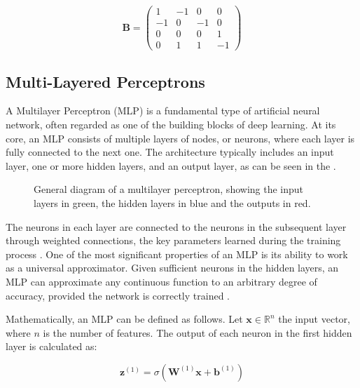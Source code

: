 \[
\mathbf{B} = \begin{pmatrix}
1 & -1 & 0 & 0 \\
-1 & 0 & -1 & 0 \\
0 & 0 & 0 & 1  \\
0 & 1 & 1 & -1 
\end{pmatrix}
\]

\subsection{Multi-Layered Perceptrons}

A Multilayer Perceptron (MLP) is a fundamental type of artificial neural network, often regarded as one of the building blocks of deep learning. At its core, an MLP consists of multiple layers of nodes, or neurons, where each layer is fully connected to the next one. The architecture typically includes an input layer, one or more hidden layers, and an output layer, as can be seen in the .


\begin{figure}
    \centering
    \setlength{}        
    \setlength{}
    \resizebox{\figurewidth}{\figureheight}{}
    \caption{General diagram of a multilayer perceptron, showing the input layers in green, the hidden layers in blue and the outputs in red.}\label{fig:FCNN_representation}
\end{figure}



The neurons in each layer are connected to the neurons in the subsequent layer through weighted connections, the key parameters learned during the training process \cite{Hippert_Pedreira_Souza_2001}. One of the most significant properties of an MLP is its ability to work as a universal approximator. Given sufficient neurons in the hidden layers, an MLP can approximate any continuous function to an arbitrary degree of accuracy, provided the network is correctly trained \cite{Zhang_Eddy_Patuwo_Y_Hu_1998}.

Mathematically, an MLP can be defined as follows. Let $\mathbf{x} \in \mathbb{R}^n$ the input vector, where $n$ is the number of features. The output of each neuron in the first hidden layer is calculated as:

\begin{equation}
 \mathbf{z}^{(1)} = \sigma\left(\mathbf{W}^{(1)}\mathbf{x} + \mathbf{b}^{(1)}\right)   
    \label{eq:output_neuron}
\end{equation}



